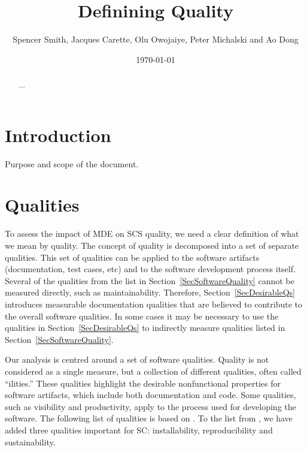 \documentclass[12pt]{article}
\begin{document}
\title{Definining Quality} 
\author{Spencer Smith, Jacques Carette, Olu Owojaiye, Peter Michalski and Ao Dong}
\date{\today}
	
\maketitle

\begin{abstract}
  ...
\end{abstract}

\tableofcontents

\newpage

\section{Introduction} \label{SecIntroduction}

Purpose and scope of the document.

\section{Qualities} \label{SecQualities}

To assess the impact of MDE on SCS quality, we need a clear definition of what
we mean by quality.  The concept of
quality is decomposed into a set of separate qualities.  This set of qualities
can be applied to the software artifacts (documentation, test cases, etc) and to
the software development process itself.  Several of the qualities from the list
in Section~\ref{SecSoftwareQuality} cannot be measured directly, such as
maintainability.  Therefore, Section~\ref{SecDesirableQs} introduces measurable
documentation qualities that are believed to contribute to the overall software
qualities.  In some cases it may be necessary to use the qualities in
Section~\ref{SecDesirableQs} to indirectly measure qualities listed in
Section~\ref{SecSoftwareQuality}.

Our analysis is centred around a set of software qualities.  Quality is not
considered as a single measure, but a collection of different qualities, often
called ``ilities.''  These qualities highlight the desirable nonfunctional
properties for software artifacts, which include both documentation and
code. Some qualities, such as visibility and productivity, apply to the process
used for developing the software. The following list of qualities is based on
\cite{GhezziEtAl2003}. To the list from \cite{GhezziEtAl2003}, we have added
three qualities important for SC: installability, reproducibility and
sustainability.
\end{document}
